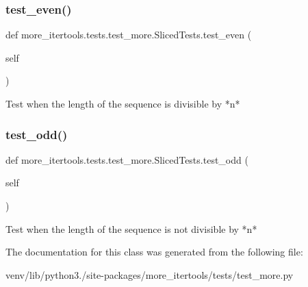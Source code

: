 \subsubsection{\texorpdfstring{test\+\_\+even()}{test\_even()}}
{\footnotesize\ttfamily def more\+\_\+itertools.\+tests.\+test\+\_\+more.\+Sliced\+Tests.\+test\+\_\+even (\begin{DoxyParamCaption}\item[{}]{self }\end{DoxyParamCaption})}

\begin{DoxyVerb}Test when the length of the sequence is divisible by *n*\end{DoxyVerb}
 \mbox{\label{classmore__itertools_1_1tests_1_1test__more_1_1_sliced_tests_a1e7ce6b4a054c00ffc3f386bb2ca66e4}} 
\subsubsection{\texorpdfstring{test\+\_\+odd()}{test\_odd()}}
{\footnotesize\ttfamily def more\+\_\+itertools.\+tests.\+test\+\_\+more.\+Sliced\+Tests.\+test\+\_\+odd (\begin{DoxyParamCaption}\item[{}]{self }\end{DoxyParamCaption})}

\begin{DoxyVerb}Test when the length of the sequence is not divisible by *n*\end{DoxyVerb}
 

The documentation for this class was generated from the following file\+:\begin{DoxyCompactItemize}
\item 
venv/lib/python3./site-\/packages/more\+\_\+itertools/tests/test\+\_\+more.\+py\end{DoxyCompactItemize}
